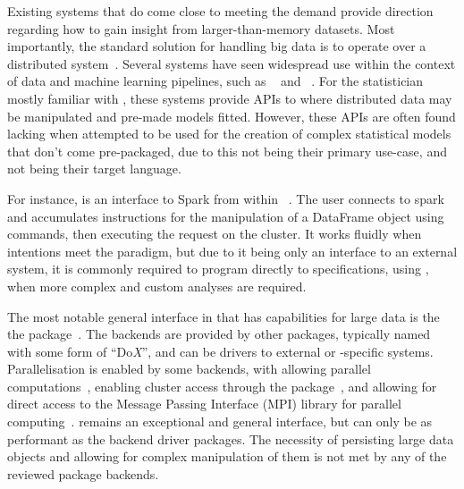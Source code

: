 \documentclass[letterpaper, inpress]{jds} %
\begin{document}
Existing systems that do come close to meeting the demand provide direction regarding how to gain insight from larger-than-memory datasets.
Most importantly, the standard solution for handling big data is to operate over a distributed system~\citep{boja2012distributed}.
Several systems have seen widespread use within the context of data and machine learning pipelines, such as ~\citep{zaharia2016apache} and ~\citep{shvachko2010hadoop}.
For the statistician mostly familiar with , these systems provide APIs to  where distributed data may be manipulated and pre-made models fitted.
However, these APIs are often found lacking when attempted to be used for the creation of complex statistical models that don't come pre-packaged, due to this not being their primary use-case, and  not being their target language.

For instance,  is an interface to Spark from within ~\citep{luraschi20}.
The user connects to spark and accumulates instructions for the manipulation of a  DataFrame object using  commands, then executing the request on the  cluster.
It works fluidly when intentions meet the  paradigm, but due to it being only an interface to an external system, it is commonly required to program directly to  specifications, using , when more complex and custom analyses are required.

The most notable general interface in  that has capabilities for large data is the the  package~\citep{microsoft20}.
The backends are provided by other packages, typically named with some form of ``Do\emph{X}'', and can be drivers to external or -specific systems.
Parallelisation is enabled by some backends, with  allowing parallel computations~\citep{corporation19},  enabling cluster access through the  package~\citep{dosnow19}, and  allowing for direct access to the Message Passing Interface (MPI) library for parallel computing~\citep{weston17}.
 remains an exceptional and general interface, but can only be as performant as the backend driver packages.
The necessity of persisting large data objects and allowing for complex manipulation of them is not met by any of the reviewed package backends.
\end{document}
